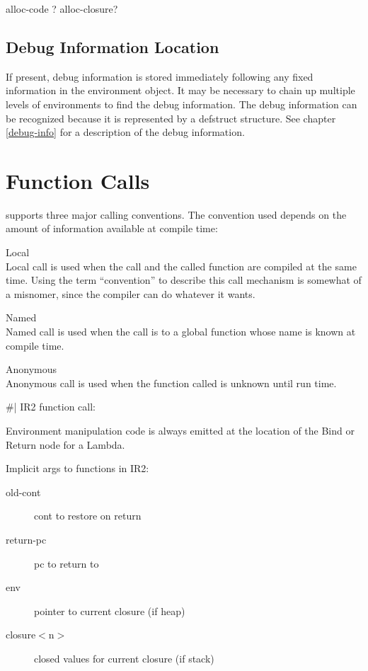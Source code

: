 {\begin{itemize, spread 0, spacing 1}
alloc-code ?
alloc-closure?


\subsection{Debug Information Location}

If present, debug information is stored immediately following any fixed
information in the environment object.  It may be necessary to chain up
multiple levels of environments to find the debug information.  The debug
information can be recognized because it is represented by a defstruct
structure.  See chapter \ref{debug-info} for a description of the debug
information.

		
\section{Function Calls}

\ccl supports three major calling conventions.  The convention used
depends on the amount of information available at compile time:
\begin{description}
Local\\Local call is used when the call and the called function are
compiled at the same time.  Using the term ``convention'' to describe this
call mechanism is somewhat of a misnomer, since the compiler can do
whatever it wants.

Named\\Named call is used when the call is to a global function whose name
is known at compile time.

Anonymous\\Anonymous call is used when the function called is unknown until
run time.
\end{description}

\#|
IR2 function call:

Environment manipulation code is always emitted at the location of the Bind or
Return node for a Lambda. 

Implicit args to functions in IR2:
\begin{description}
\item[old-cont] cont to restore on return
\item[return-pc] pc to return to
\item[env] pointer to current closure (if heap)
\item[closure$<$n$>$] closed values for current closure (if stack)
\end{description}


\end{itemize, spread 0, spacing 1}}
